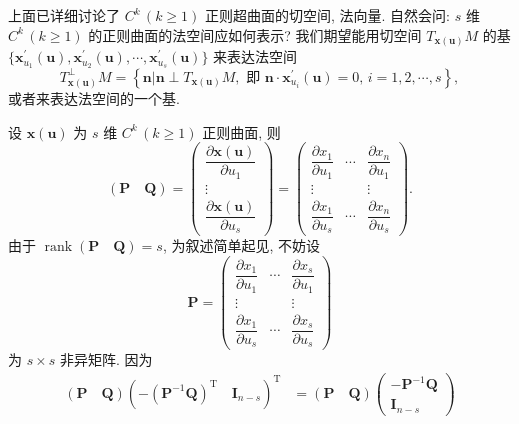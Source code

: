 上面已详细讨论了 $C^{k}\,(k \geqslant 1)$ 正则超曲面的切空间, 法向量. 自然会问: $s$ 维 $C^{k}\,(k \geqslant 1)$ 的正则曲面的法空间应如何表示? 我们期望能用切空间 $T_{\boldsymbol{x}(\boldsymbol{u})}M$ 的基 $\{\boldsymbol{x}_{u_1}^{\prime}(\boldsymbol{u}),\allowbreak \boldsymbol{x}_{u_2}^{\prime}(\boldsymbol{u}),\allowbreak \cdots,\allowbreak \boldsymbol{x}_{u_s}^{\prime}(\boldsymbol{u})\}$ 来表达法空间
\[
  T_{\boldsymbol{x}(\boldsymbol{u})}^{\perp}M = \left\{\boldsymbol{n} \mathrel{\Big|} \boldsymbol{n} \perp T_{\boldsymbol{x}(\boldsymbol{u})}M, \text{ 即 } \boldsymbol{n} \cdot \boldsymbol{x}^{\prime}_{u_{i}}(\boldsymbol{u}) = 0, \, i = 1, 2, \cdots, s\right\},
\]
或者来表达法空间的一个基.

\begin{example}\label{ex:9.1.4}
设 $\boldsymbol{x}(\boldsymbol{u})$ 为 $s$ 维 $C^{k}\,(k \geqslant 1)$ 正则曲面, 则
\[
  (\boldsymbol{P} \quad \boldsymbol{Q}) = \begin{pmatrix}
    \dfrac{\partial\boldsymbol{x}(\boldsymbol{u})}{\partial u_{1}} \\
    \vdots \\
    \dfrac{\partial\boldsymbol{x}(\boldsymbol{u})}{\partial u_{s}}
  \end{pmatrix} = \begin{pmatrix}
    \dfrac{\partial x_{1}}{\partial u_{1}} & \cdots & \dfrac{\partial x_{n}}{\partial u_{1}} \\
    \vdots & & \vdots \\
    \dfrac{\partial x_{1}}{\partial u_{s}} & \cdots & \dfrac{\partial x_{n}}{\partial u_{s}}
  \end{pmatrix}.
\]
由于 $\operatorname{rank}(\boldsymbol{P} \quad \boldsymbol{Q}) = s$, 为叙述简单起见, 不妨设
\[
  \boldsymbol{P} = \begin{pmatrix}
    \dfrac{\partial x_{1}}{\partial u_{1}} & \cdots & \dfrac{\partial x_{s}}{\partial u_{1}} \\
    \vdots & & \vdots \\
    \dfrac{\partial x_{1}}{\partial u_{s}} & \cdots & \dfrac{\partial x_{s}}{\partial u_{s}}
  \end{pmatrix}
\]
为 $s \times s$ 非异矩阵. 因为
\begin{align*}
  (\boldsymbol{P} \quad \boldsymbol{Q})\left(-(\boldsymbol{P}^{-1}\boldsymbol{Q})^{\mathrm{T}} \quad \boldsymbol{I}_{n-s}\right)^{\mathrm{T}}
  &= (\boldsymbol{P} \quad \boldsymbol{Q})\begin{pmatrix} -\boldsymbol{P}^{-1}\boldsymbol{Q} \\ \boldsymbol{I}_{n-s} \end{pmatrix} \\

\end{align*}
\end{example}
